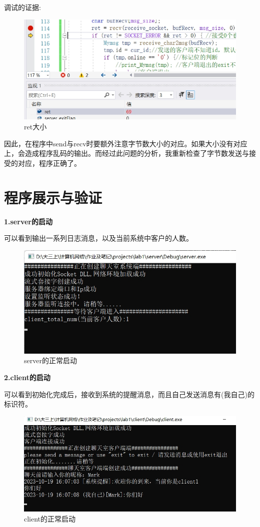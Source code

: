 \documentclass[12pt]{article}
\begin{document}
调试的证据:
\begin{figure}[H]
        \centering
        \includegraphics[scale=0.5]{fig/7.png}
        \caption{ret大小}
       \label{fig:11}
\end{figure}

因此，在程序中send与recv时要额外注意字节数大小的对应。如果大小没有对应上，会造成程序乱码的输出。而经过此问题的分析，我重新检查了字节数发送与接受的对应，程序正确了。
\section{程序展示与验证}

\textbf{1.server的启动}

可以看到输出一系列日志消息，以及当前系统中客户的人数。
\begin{figure}[H]
        \centering
        \includegraphics[scale=0.45]{fig/8.png}
        \caption{server的正常启动}
       \label{fig:12}
\end{figure}

\textbf{2.client的启动}

可以看到初始化完成后，接收到系统的提醒消息，而且自己发送消息有(我自己)的标识符。
\begin{figure}[H]
        \centering
        \includegraphics[scale=0.45]{fig/10.png}
        \caption{client的正常启动}
       \label{fig:13}
\end{figure}
\end{document}
